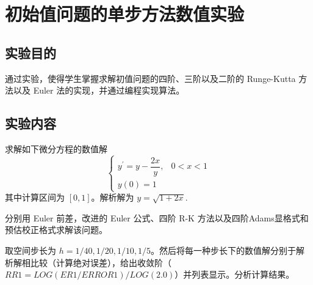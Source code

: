 \documentclass[12pt, a4paper, oneside]{ctexart}
\begin{document}
\def\bs#1{{#1}}%
\section{初始值问题的单步方法数值实验}
\subsection{实验目的}
通过实验，使得学生掌握求解初值问题的四阶、三阶以及二阶的 Runge-Kutta 方法以及 Euler 法的实现，并通过编程实现算法。
\subsection{实验内容}
求解如下微分方程的数值解
$$
\begin{cases}
    y^\prime = y - \dfrac{2x}{y}, &0<x<1 \\
    y(0) = 1
\end{cases}
$$
其中计算区间为 $[0,1]$。解析解为 $y = \sqrt{1+2x}$.

分别用 Euler 前差，改进的 Euler 公式、四阶 R-K 方法以及四阶Adams显格式和预估校正格式求解该问题。

取空间步长为 $h=1/40,1/20,1/10,1/5$。然后将每一种步长下的数值解分别于解析解相比较（计算绝对误差），给出收敛阶（$RR1=LOG(ER1/ERROR1)/LOG(2.0)$）并列表显示。分析计算结果。
\end{document}
